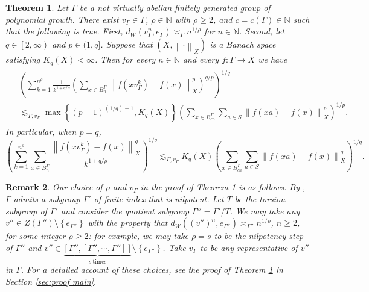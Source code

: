 \documentclass[11pt,reqno]{amsart}
\newtheorem{theorem}{Theorem}
\newtheorem{remark}[theorem]{Remark}
\newcommand{\1}{\mathbf 1}
\begin{document}
\begin{theorem}\label{thm:discrete}
Let $\Gamma$ be a not virtually abelian finitely generated group of polynomial growth. There exist $v_\Gamma\in \Gamma$, $\rho\in \mathbb{N}$ with $\rho\ge 2$, and $c=c\left(\Gamma\right)\in \mathbb{N}$ such that the following is true. First, $d_W\left(v_\Gamma^n,e_\Gamma\right)\asymp_\Gamma n^{1/\rho}$ for $n\in \mathbb{N}$. Second, let $q\in \left[2,\infty\right)$ and $p\in (1, q]$. Suppose that $\left(X,\left\|\cdot\right\|_X\right)$ is a Banach space satisfying $K_q\left(X\right)<\infty$.  Then for every $n\in \mathbb{N}$ and every $f:\Gamma\to X$ we have
\begin{align}\label{eq:desired local pq}
\begin{aligned}
&\left(\sum_{k=1}^{n^\rho}\frac{1}{k^{1+q/\rho}}\left(\sum_{x\in B^\Gamma_n} \left\|f\left(xv_\Gamma^k\right)-f\left(x\right)\right\|_X^p\right)^{q/p}\right)^{1/q}\\
&\lesssim_{\Gamma,v_\Gamma} \max\left\{\left(p-1\right)^{(1/q)-1},K_q\left(X\right)\right\} 
\left(\sum_{x\in B^\Gamma_{cn}} \sum_{a\in S}\left\|f\left(xa\right)-f\left(x\right)\right\|^p_X\right)^{1/p}.
\end{aligned}
\end{align}
In particular, when $p=q$,
\begin{equation}\label{eq:main}
\left(\sum_{k=1}^{n^\rho}\sum_{x\in B^\Gamma_n}\frac{ \left\|f\left(xv_\Gamma^k\right)-f\left(x\right)\right\|_X^q}{k^{1+q/\rho}}\right)^{1/q}\lesssim_{\Gamma,v_\Gamma}
K_q\left(X\right)\left( \sum_{x\in B^\Gamma_{cn}} \sum_{a\in S}\left\|f\left(xa\right)-f\left(x\right)\right\|^q_X\right)^{1/q}.
\end{equation}
\end{theorem}

\begin{remark}
Our choice of $\rho$ and $v_\Gamma$ in the proof of Theorem \ref{thm:discrete} is as follows. By \cite{gromov1981groups}, $\Gamma$ admits a subgroup $\Gamma'$ of finite index that is nilpotent. Let $T$ be the torsion subgroup of $\Gamma'$ and consider the quotient subgroup $\Gamma''=\Gamma'/T$. We may take any $v''\in Z\left(\Gamma''\right)\setminus\left\{e_{\Gamma''}\right\}$ with the property that $d_W\left(\left(v''\right)^n,e_{\Gamma''}\right)\asymp_{\Gamma''}n^{1/\rho}$, $n\ge 2$, for some integer $\rho\ge 2$: for example, we may take $\rho=s$ to be the nilpotency step of $\Gamma''$ and $v''\in \underbrace{\left[\Gamma'',\left[\Gamma'',\cdots,\Gamma''\right]\right]}_{s\mathrm{~times}}\setminus\left\{e_{\Gamma''}\right\}$. Take $v_\Gamma$ to be any representative of $v''$ in $\Gamma$. For a detailed account of these choices, see the proof of Theorem \ref{thm:discrete} in Section \ref{sec:proof main}.
\end{remark}
\end{document}
